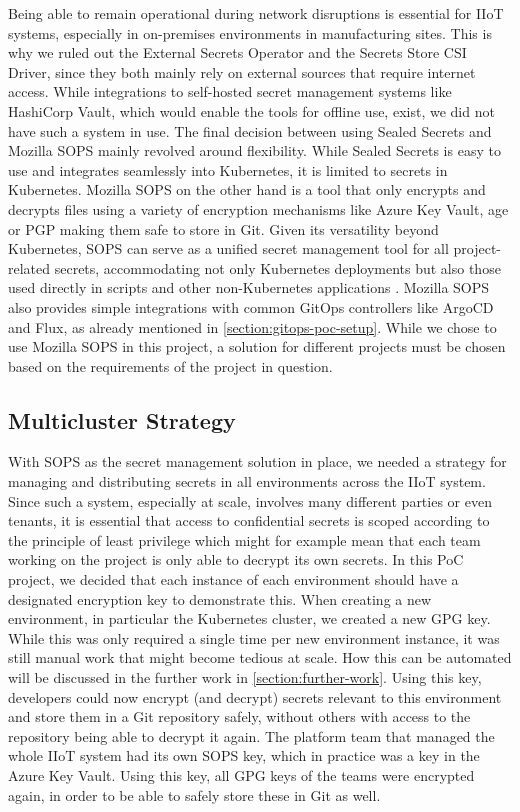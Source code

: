             Being able to remain operational during network disruptions is essential for IIoT systems, especially in on-premises environments in manufacturing sites. This is why we ruled out the External Secrets Operator and the Secrets Store CSI Driver, since they both mainly rely on external sources that require internet access. While integrations to self-hosted secret management systems like HashiCorp Vault, which would enable the tools for offline use, exist, we did not have such a system in use. The final decision between using Sealed Secrets and Mozilla SOPS mainly revolved around flexibility. While Sealed Secrets is easy to use and integrates seamlessly into Kubernetes, it is limited to secrets in Kubernetes. Mozilla SOPS on the other hand is a tool that only encrypts and decrypts files using a variety of encryption mechanisms like Azure Key Vault, age or PGP making them safe to store in Git. Given its versatility beyond Kubernetes, SOPS can serve as a unified secret management tool for all project-related secrets, accommodating not only Kubernetes deployments but also those used directly in scripts and other non-Kubernetes applications \cite{mozillasops}. Mozilla SOPS also provides simple integrations with common GitOps controllers like ArgoCD and Flux, as already mentioned in \autoref{section:gitops-poc-setup}. While we chose to use Mozilla SOPS in this project, a solution for different projects must be chosen based on the requirements of the project in question.

        \subsection{Multicluster Strategy}
        \label{subsection:secret-distribution-strategy}

            With SOPS as the secret management solution in place, we needed a strategy for managing and distributing secrets in all environments across the IIoT system. Since such a system, especially at scale, involves many different parties or even tenants, it is essential that access to confidential secrets is scoped according to the principle of least privilege which might for example mean that each team working on the project is only able to decrypt its own secrets. In this PoC project, we decided that each instance of each environment should have a designated encryption key to demonstrate this. When creating a new environment, in particular the Kubernetes cluster, we created a new GPG key. While this was only required a single time per new environment instance, it was still manual work that might become tedious at scale. How this can be automated will be discussed in the further work in \autoref{section:further-work}. Using this key, developers could now encrypt (and decrypt) secrets relevant to this environment and store them in a Git repository safely, without others with access to the repository being able to decrypt it again. The platform team that managed the whole IIoT system had its own SOPS key, which in practice was a key in the Azure Key Vault. Using this key, all GPG keys of the teams were encrypted again, in order to be able to safely store these in Git as well. \newline
            
